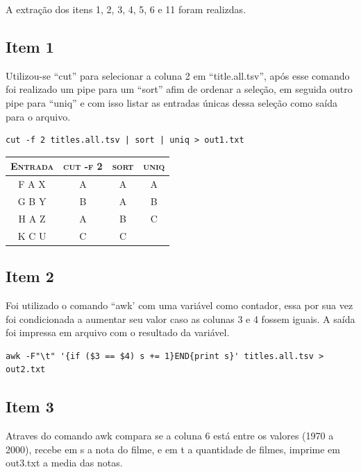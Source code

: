 \documentclass[12pt]{article}
\begin{document}
A extração dos itens 1, 2, 3, 4, 5, 6 e 11 foram realizdas.

\subsection*{Item 1}

Utilizou-se ``cut'' para selecionar a coluna 2 em ``title.all.tsv'', após esse comando foi realizado um pipe para um ``sort'' afim de ordenar a seleção, em seguida outro pipe para ``uniq'' e com isso listar as entradas únicas dessa seleção como saída para o arquivo.

\begin{verbatim}
cut -f 2 titles.all.tsv | sort | uniq > out1.txt
\end{verbatim}

\begin{table}[!h]
    \begin{tabular}{ c c c c }
        \textsc{Entrada} & \textsc{cut -f 2} & \textsc{sort} & \textsc{uniq} \\ 
        \hline
        F A X & A & A & A \\ 
        G B Y & B & A & B \\
        H A Z & A & B & C \\
        K C U & C & C &   \\
    \end{tabular}
\end{table}

\subsection*{Item 2}

Foi utilizado o comando ``awk' com uma variável como contador, essa por sua vez foi condicionada a aumentar seu valor caso as colunas 3 e 4 fossem iguais. A saída foi impressa em arquivo com o resultado da variável.

\begin{verbatim}
awk -F"\t" '{if ($3 == $4) s += 1}END{print s}' titles.all.tsv > out2.txt
\end{verbatim}

\subsection*{Item 3}

Atraves do comando awk compara se a coluna 6 está entre os valores (1970 a 2000), recebe em s a nota do filme, e em t a quantidade de filmes, imprime em out3.txt a media das notas.
\end{document}

